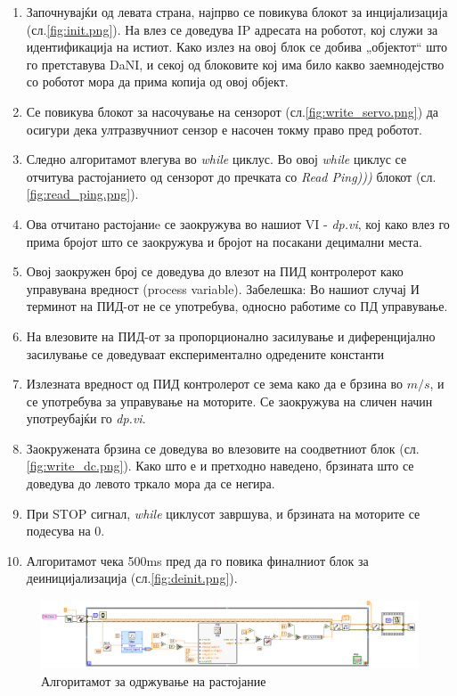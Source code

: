 \documentclass{article}
\begin{document}
\begin{enumerate}
\item Започнувајќи од левата страна, најпрво се повикува блокот за инцијализација (сл.\ref{fig:init.png}). На влез се доведува IP адресата на роботот, кој служи за идентификација на истиот. Како излез на овој блок се добива „објектот“ што го претставува DaNI, и секој од блоковите кој има било какво заемнодејство со роботот мора да прима копија од овој објект.
\item Се повикува блокот за насочување на сензорот (сл.\ref{fig:write_servo.png}) да осигури дека ултразвучниот сензор е насочен токму право пред роботот.
\item Следно алгоритамот влегува во \textit{while} циклус. Во овој \textit{while} циклус се отчитува растојанието од сензорот до пречката со \textit{Read Ping)))} блокот (сл.\ref{fig:read_ping.png}).
\item Ова отчитано растојаниe се заокружува во нашиот VI - \textit{dp.vi}, кој како влез го прима бројот што се заокружува и бројот на посакани децимални места.
\item Овој заокружен број се доведува до влезот на ПИД контролерот како управувана вредност (process variable). Забелешка: Во нашиот случај И терминот на ПИД-от не се употребува, односно работиме со ПД управување.
\item На влезовите на ПИД-от за пропорционално засилување и диференцијално засилување се доведуваат експериментално одредените константи
\item Излезната вредност од ПИД контролерот се зема како да е брзина во $m/s$, и се употребува за управување на моторите. Се заокружува на сличен начин употреубајќи го \textit{dp.vi}.
\item Заокружената брзина се доведува во влезовите на соодветниот блок (сл.\ref{fig:write_dc.png}). Како што е и претходно наведено, брзината што се доведува до левото тркало мора да се негира.
\item При STOP сигнал, \textit{while} циклусот завршува, и брзината на моторите се подесува на 0.
\item Алгоритамот чека 500ms пред да го повика финалниот блок за деиницијализација (сл.\ref{fig:deinit.png}).
\end{enumerate}

\begin{figure}[H]
\centering
\includegraphics[width=0.80\paperheight,angle=90]{./images/PID_Control.png}
\caption{Алгоритамот за одржување на растојание}
\label{fig:PID_Control.png}
\end{figure}
\end{document}
